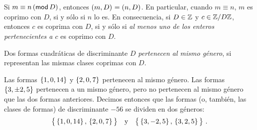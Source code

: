\begin{obsGeneros}\label{obs:generos:clases-coprimas}
	Si $m\equiv n\tmodulo[D]$, entonces $\mcd{m,D}=\mcd{n,D}$.
	En particular, cuando $m\equiv n$, $m$ es coprimo con $D$, si
	y s\'olo si $n$ lo es. En consecuencia,
	si $D\in\Enteros$ y $c\in\Enterosmod[D]$, entonces $c$ es coprima
	con $D$, si y s\'olo si \emph{al menos uno de los enteros %
	pertenecientes a $c$} es coprimo con $D$.
\end{obsGeneros}

\begin{defGeneros}\label{def:generos}
	Dos formas cuadr\'aticas %
	de discriminante $D$ \emph{pertenecen al mismo g\'enero},
	si representan las mismas clases coprimas con $D$.
\end{defGeneros}

\begin{ejemGeneros}\label{ejem:generos:representacion:mod:bis}
	Las formas $\binaria{1,0,14}$ y $\binaria{2,0,7}$ pertenecen al
	mismo g\'enero. Las formas $\binaria{3,\pm 2,5}$ pertenecen a
	un mismo g\'enero, pero no pertenecen al mismo g\'enero que
	las dos formas anteriores. Decimos entonces que las formas
	(o, tambi\'en, las clases de formas) de discriminante $-56$
	se dividen en dos g\'eneros:
	\begin{displaymath}
		\big\{
			\binaria{1,0,14},\,\binaria{2,0,7}
		\big\}\dispand
		\big\{
			\binaria{3,-2,5},\,\binaria{3,2,5}
		\big\}
		\dispstop
	\end{displaymath}
\end{ejemGeneros}

